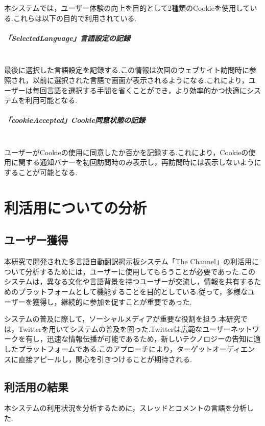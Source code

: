 \documentclass[b5paper,12pt,dvipdfmx]{jsreport}
\begin{document}
本システムでは，ユーザー体験の向上を目的として2種類のCookieを使用している.これらは以下の目的で利用されている.

\paragraph{「SelectedLanguage」言語設定の記録}\mbox{}\\
最後に選択した言語設定を記録する.この情報は次回のウェブサイト訪問時に参照され，以前に選択された言語で画面が表示されるようになる.これにより，ユーザーは毎回言語を選択する手間を省くことができ，より効率的かつ快適にシステムを利用可能となる.

\paragraph{「cookieAccepted」Cookie同意状態の記録}\mbox{}\\
ユーザーがCookieの使用に同意したか否かを記録する.これにより，Cookieの使用に関する通知バナーを初回訪問時のみ表示し，再訪問時には表示しないようにすることが可能となる.


\chapter{利活用についての分析}

\section{ユーザー獲得}

本研究で開発された多言語自動翻訳掲示板システム「The Channel」の利活用について分析するためには，ユーザーに使用してもらうことが必要であった.このシステムは，異なる文化や言語背景を持つユーザーが交流し，情報を共有するためのプラットフォームとして機能することを目的としている.従って，多様なユーザーを獲得し，継続的に参加を促すことが重要であった.

システムの普及に際して，ソーシャルメディアが重要な役割を担う.本研究では，Twitterを用いてシステムの普及を図った.Twitterは広範なユーザーネットワークを有し，迅速な情報伝播が可能であるため，新しいテクノロジーの告知に適したプラットフォームである.このアプローチにより，ターゲットオーディエンスに直接アピールし，関心を引きつけることが期待される.

\section{利活用の結果}
本システムの利用状況を分析するために，スレッドとコメントの言語を分析した.
\end{document}
